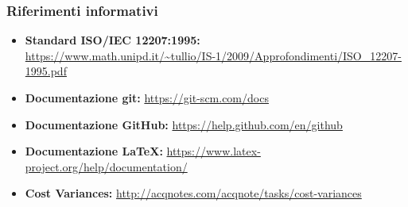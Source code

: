 		\subsubsection{Riferimenti informativi}
			\begin{itemize}
				\item \textbf{Standard ISO/IEC 12207:1995: } \\
				\url{https://www.math.unipd.it/~tullio/IS-1/2009/Approfondimenti/ISO_12207-1995.pdf}
				\item \textbf{Documentazione git: }\url{https://git-scm.com/docs} 
				\item \textbf{Documentazione GitHub: }\url{https://help.github.com/en/github}
				\item \textbf{Documentazione LaTeX: }\url{https://www.latex-project.org/help/documentation/}
				\item \textbf{Cost Variances: } \url{http://acqnotes.com/acqnote/tasks/cost-variances}
			\end{itemize}
		

